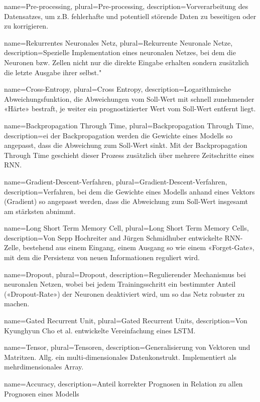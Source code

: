 {
name=Pre-processing,
plural=Pre-processing,
description={Vorverarbeitung des Datensatzes, um z.B. fehlerhafte und potentiell störende Daten zu beseitigen oder zu korrigieren.}
}

{
name=Rekurrentes Neuronales Netz,
plural=Rekurrente Neuronale Netze,
description={Spezielle Implementation eines neuronalen Netzes, bei dem die Neuronen bzw. Zellen nicht nur die direkte Eingabe erhalten sondern zusätzlich die letzte Ausgabe ihrer selbst.}"
}

{
name=Cross-Entropy,
plural=Cross Entropy,
description={Logarithmische Abweichungsfunktion, die Abweichungen vom Soll-Wert mit schnell zunehmender «Härte» bestraft, je weiter ein prognostizierter Wert vom Soll-Wert entfernt liegt.}
}

{
name=Backpropagation Through Time,
plural=Backpropagation Through Time,
description={ei der Backpropagation werden die Gewichte eines Modells so angepasst, dass die Abweichung zum Soll-Wert sinkt. Mit der Backpropagation Through Time geschieht dieser Prozess zusätzlich über mehrere Zeitschritte eines RNN.}
}

{
name=Gradient-Descent-Verfahren,
plural=Gradient-Descent-Verfahren,
description={Verfahren, bei dem die Gewichte eines Modells anhand eines Vektors (Gradient) so angepasst werden, dass die Abweichung zum Soll-Wert insgesamt am stärksten abnimmt.}
}

{
name=Long Short Term Memory Cell,
plural=Long Short Term Memory Cells,
description={Von Sepp Hochreiter and Jürgen Schmidhuber entwickelte RNN-Zelle, bestehend aus einem Eingang, einem Ausgang so wie einem «Forget-Gate», mit dem die Persistenz von neuen Informationen reguliert wird.}
}


{
name=Dropout,
plural=Dropout,
description={Regulierender Mechanismus bei neuronalen Netzen, wobei bei jedem Trainingsschritt ein bestimmter Anteil («Dropout-Rate») der Neuronen deaktiviert wird, um so das Netz robuster zu machen.}
}

{
name=Gated Recurrent Unit,
plural=Gated Recurrent Units,
description=Von Kyunghyun Cho et al. entwickelte Vereinfachung eines LSTM.
}

{
name=Tensor,
plural=Tensoren,
description=Generalisierung von Vektoren und Matritzen. Allg. ein multi-dimensionales Datenkonstrukt. Implementiert als mehrdimensionales Array.
}


{
name=Accuracy,
description=Anteil korrekter Prognosen in Relation zu allen Prognosen eines Modells
}

